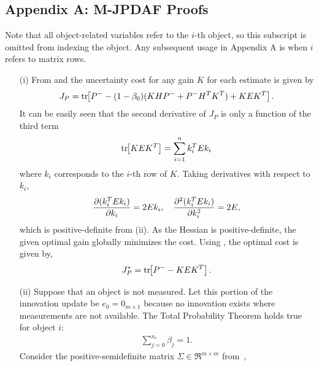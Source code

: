 \begin{appendix}
\label{append}

\subsection*{Appendix A: M-JPDAF Proofs} \label{NewPartOfEIsPSD}
Note that all object-related variables refer to the $i$-th object, so this subscript is omitted from indexing the object. Any subsequent usage in Appendix A is when $i$ refers to matrix rows.
\begin{itemize}
\item[(i)] From  and  the uncertainty cost for any gain $K$ for each estimate is given by
\begin{align}
\label{eqn:JpAppend}
J_P=\mathrm{tr}\negthickspace\left[ P^--(1-\beta_{0})(KHP^-+P^-H^TK^T)+KEK^T \right].
\end{align}
It can be easily seen that the second derivative of $J_P$ is only a function of the third term
\begin{align}
\mathrm{tr}\negthickspace\left[ KEK^T \right]=\sum\limits_{i=1}^nk_i^TEk_i
\end{align}
where $k_i$ corresponds to the $i$-th row of $K$.
Taking derivatives with respect to $k_i$,
\begin{align}
\frac{\partial (k_i^TEk_i)}{\partial k_i}=2Ek_i,
\quad
\frac{\partial^2(k_i^TEk_i)}{\partial k_i^2}=2E,
\end{align}
which is positive-definite from (ii).
As the Hessian is positive-definite, the given optimal gain globally minimizes the cost.
Using , the optimal cost is given by,
\begin{align}
\label{eqn:OptCost}
J^*_{P} = \mathrm{tr}\negthickspace\left[ P^--KEK^T \right].
\end{align}
\item[(ii)] Suppose that an object is not measured.
Let this portion of the innovation update be $e_0=0_{m\times1}$ because no innovation exists where measurements are not available.
The Total Probability Theorem holds true for object $i$:
\begin{align}
\sum\limits_{j=0}^{n_r}\beta_{j}=1.
\end{align}
Consider the positive-semidefinite matrix $\Sigma\in\Re^{m\times m}$ from~\cite[Eq. 1.4.16-(1-10)]{ShaRonThi2001},%

\end{itemize}
\end{appendix}
